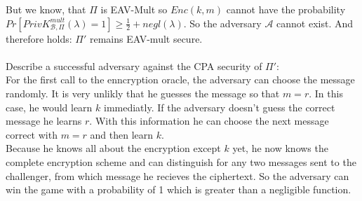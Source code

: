 But we know, that \(\Pi\) is EAV-Mult so \(Enc(k,m)\) cannot have the probability \(Pr[PrivK^{mult}_{\mathcal{B}, \Pi} (\lambda) = 1] \ge \frac{1}{2} + negl(\lambda) \). So the adversary \(\mathcal{A}\) cannot exist. And therefore holds: \(\Pi'\) remains EAV-mult secure.\\
\\
Describe a successful adversary against the CPA security of \(\Pi'\):\\
For the first call to the enncryption oracle, the adversary can choose the message randomly. It is very unlikly that he guesses the message so that \(m = r\). In this case, he would learn \(k\) immediatly. If the adversary doesn't guess the correct message he learns \(r\). With this information he can choose the next message correct with \(m = r\) and then learn \(k\). \\
Because he knows all about the encryption except \(k\) yet, he now knows the complete encryption scheme and can distinguish for any two messages sent to the challenger, from which message he recieves the ciphertext. So the adversary can win the game with a probability of 1 which is greater than a negligible function.